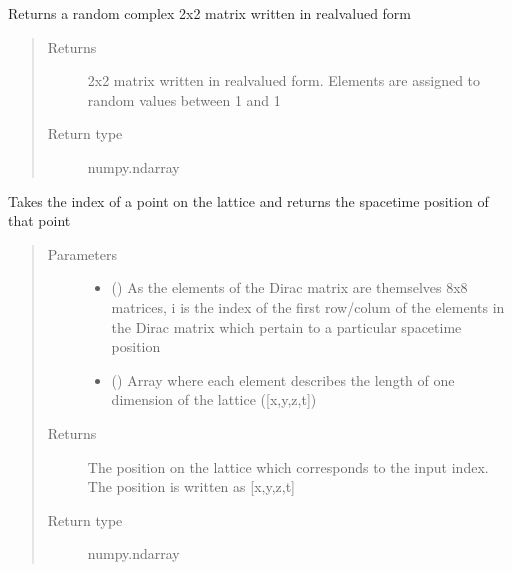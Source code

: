 \documentclass[letterpaper,10pt,english]{sphinxmanual}
\begin{document}

\begin{fulllineitems}
\label{\detokenize{index:su2.hstart}}
Returns a random complex 2x2 matrix written in real\sphinxhyphen{}valued form
\begin{quote}\begin{description}
\item[{Returns}] \leavevmode
2x2 matrix written in real\sphinxhyphen{}valued form. Elements are assigned
to random values between \sphinxhyphen{}1 and 1

\item[{Return type}] \leavevmode
numpy.ndarray

\end{description}\end{quote}

\end{fulllineitems}


\begin{fulllineitems}
\label{\detokenize{index:su2.i2p}}
Takes the index of a point on the lattice and returns the
spacetime position of that point
\begin{quote}\begin{description}
\item[{Parameters}] \leavevmode\begin{itemize}
\item {} 
 () \textendash{} As the elements of the Dirac matrix are themselves 8x8
matrices, i is the index of the first row/colum of the elements
in the Dirac matrix which pertain to a particular spacetime
position

\item {} 
 () \textendash{} Array where each element describes the length of one dimension
of the lattice ({[}x,y,z,t{]})

\end{itemize}

\item[{Returns}] \leavevmode
The position on the lattice which corresponds to the input
index. The position is written as {[}x,y,z,t{]}

\item[{Return type}] \leavevmode
numpy.ndarray

\end{description}\end{quote}

\end{fulllineitems}
\end{document}
